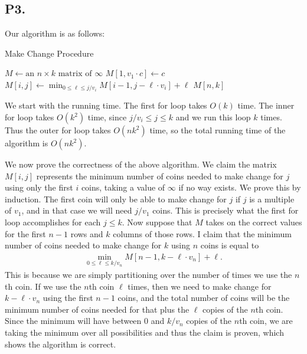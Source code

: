 \documentclass[12pt]{article}
\theoremstyle{definitionstyle}
\begin{document}
    \newpage
    \subsection*{P3.}
    Our algorithm is as follows:
    \begin{algorithm}
        \caption{Make Change Procedure}
        \begin{algorithmic} %
            \State $M \gets \text{an } n \times k \text{ matrix of $\infty$}$
                \State $M[1,v_1 \cdot c] \gets c$
            \EndFor
                    \State $M[i,j] \gets \displaystyle \min_{0 \leq \ell \leq j/v_i} M[i-1, j - \ell \cdot v_i] + \ell$
                \EndFor
            \EndFor
            \State \Return $M[n,k]$
            \EndProcedure
        \end{algorithmic}
    \end{algorithm}

    We start with the running time. The first for loop takes $O(k)$ time. The inner for loop takes $O(k^2)$ time, since $j/v_i \leq j \leq k$ and we run this loop $k$ times. Thus the outer for loop takes $O(n k^2)$ time, so the total running time of the algorithm is $O(nk^2)$.

    We now prove the correctness of the above algorithm. We claim the matrix $M[i,j]$ represents the minimum number of coins needed to make change for $j$ using only the first $i$ coins, taking a value of $\infty$ if no way exists. We prove this by induction. The first coin will only be able to make change for $j$ if $j$ is a multiple of $v_1$, and in that case we will need $j/v_1$ coins. This is precisely what the first for loop accomplishes for each $j \leq k$. Now suppose that $M$ takes on the correct values for the first $n-1$ rows and $k$ columns of those rows. I claim that the minimum number of coins needed to make change for $k$ using $n$ coins is equal to 
    \begin{align*}
        \min_{0 \leq \ell \leq k/v_n} M[n-1, k - \ell \cdot v_n] + \ell.
    \end{align*}
    This is because we are simply partitioning over the number of times we use the $n$th coin. If we use the $n$th coin $\ell$ times, then we need to make change for $k - \ell \cdot v_n$ using the first $n-1$ coins, and the total number of coins will be the minimum number of coins needed for that plus the $\ell$ copies of the $n$th coin. Since the minimum will have between $0$ and $k/v_n$ copies of the $n$th coin, we are taking the minimum over all possibilities and thus the claim is proven, which shows the algorithm is correct.
\end{document}
